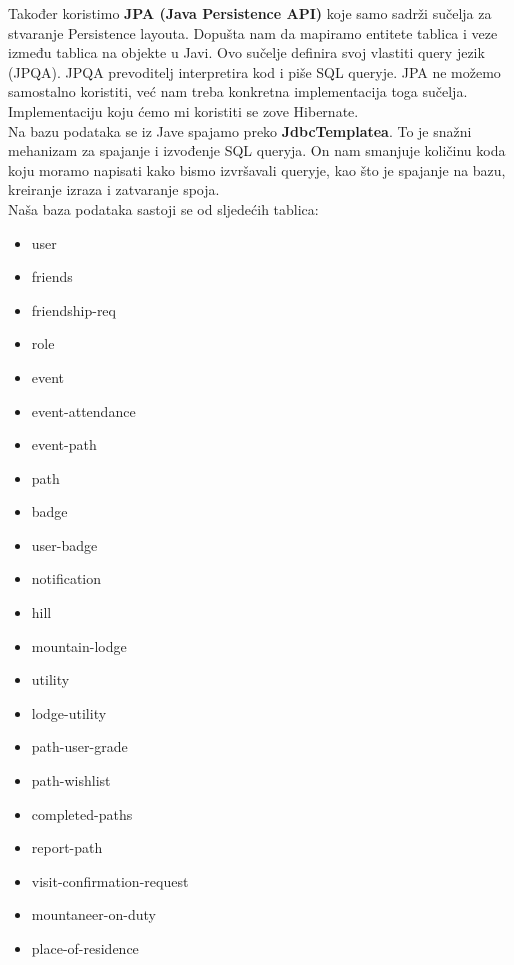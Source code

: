 		Također koristimo \textbf{JPA (Java Persistence API)} koje samo sadrži sučelja za stvaranje Persistence layouta. Dopušta nam da mapiramo entitete tablica i veze između tablica na objekte u Javi. Ovo sučelje definira svoj vlastiti query jezik (JPQA). JPQA prevoditelj interpretira kod i piše SQL queryje. JPA ne možemo samostalno koristiti, već nam treba konkretna implementacija toga sučelja. Implementaciju koju ćemo mi koristiti se zove Hibernate. \\ 
		
		Na bazu podataka se iz Jave spajamo preko \textbf{JdbcTemplatea}. To je snažni mehanizam za spajanje i izvođenje SQL queryja. On nam smanjuje količinu koda koju moramo napisati kako bismo izvršavali queryje, kao što je spajanje na bazu, kreiranje izraza i zatvaranje spoja. \\
		
	Naša baza podataka sastoji se od sljedećih tablica:
		\begin{itemize}[noitemsep]
		\item
			user
		\item
			friends
		\item
			friendship-req
		\item
			role
		\item
			event
		\item
			event-attendance
		\item
			event-path
		\item
			path
		\item
			badge
		\item
			user-badge
		\item
			notification
		\item
			hill
		\item
			mountain-lodge
		\item
			utility
		\item
			lodge-utility
		\item
			path-user-grade
		\item
			path-wishlist
		\item
			completed-paths
		\item
			report-path
		\item
			visit-confirmation-request
		\item
			mountaneer-on-duty
		\item
			place-of-residence	


\end{itemize}
		
		
